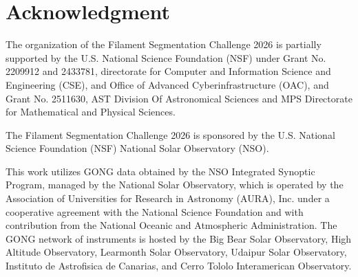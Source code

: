 \documentclass[sigconf]{acmart}
\begin{document}
\clearpage
\section{Acknowledgment}
The organization of the Filament Segmentation Challenge 2026 is partially
supported by the U.S. National Science Foundation (NSF) under Grant No.
2209912 and 2433781, directorate for Computer and Information Science and
Engineering (CSE), and Office of Advanced Cyberinfrastructure (OAC), and
Grant No. 2511630, AST Division Of Astronomical Sciences and MPS Directorate
for Mathematical and Physical Sciences.

The Filament Segmentation Challenge 2026 is sponsored by the U.S. National
Science Foundation (NSF) National Solar Observatory (NSO).

This work utilizes GONG data obtained by the NSO Integrated Synoptic Program,
managed by the National Solar Observatory, which is operated by the
Association of Universities for Research in Astronomy (AURA), Inc. under a
cooperative agreement with the National Science Foundation and with
contribution from the National Oceanic and Atmospheric Administration.
The GONG network of instruments is hosted by the Big Bear Solar Observatory,
High Altitude Observatory, Learmonth Solar Observatory, Udaipur Solar
Observatory, Instituto de Astrofisica de Canarias, and Cerro Tololo
Interamerican Observatory.



\end{document}
